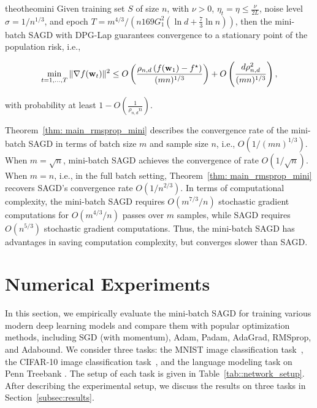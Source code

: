 \documentclass[11pt]{article}
\begin{document}
\begin{restatable}{theo}{theomini}
\label{thm: main_rmsprop_mini}
Given training set $S$ of size $n$, with $\nu >0$, $\eta_t = \eta \leq \frac{\nu}{2L}$, noise level $\sigma = 1/n^{1/3}$, and epoch $T = m^{4/3}/\left(n169G_1^2(\ln d + \frac{7}{3}\ln n)\right)$, then the mini-batch \textsc{SAGD} with DPG-Lap  guarantees convergence to a stationary point of the population risk, i.e., 
 \begin{small}
\begin{equation*}
\begin{split}
 \min_{t = 1,..., T}\|\nabla f(\mathbf{w}_t)\|^2 
 \leq O\left( \frac{\rho_{n,d} \left(f(\mathbf{w}_1) - f^\star \right)}{(mn)^{1/3}} \right)+ O \left( \frac{d \rho_{n,d}^2}{(mn)^{1/3}}\right),
 \end{split}
\end{equation*}
\end{small}
with probability at least $1-O\left(\frac{1}{\rho_{n,d} n}\right)$.
\end{restatable}

Theorem~\ref{thm: main_rmsprop_mini} 
describes the convergence rate of the mini-batch \textsc{SAGD} in terms of batch size $m$ and sample size $n$, i.e., $O(1/(mn)^{1/3})$. 
When $m = \sqrt{n}$, mini-batch \textsc{SAGD} achieves the convergence of rate $O(1/\sqrt{n})$. When $m=n$, i.e., in the full batch setting, Theorem~\ref{thm: main_rmsprop_mini} recovers \textsc{SAGD}'s convergence rate  $O(1/n^{2/3})$. 
In terms of computational complexity, the mini-batch \textsc{SAGD} requires $O(m^{7/3}/n)$ stochastic gradient computations for $O(m^{4/3}/n)$ passes over $m$ samples, while \textsc{SAGD} requires $O(n^{5/3})$ stochastic gradient computations. Thus, the mini-batch \textsc{SAGD} has advantages in saving computation complexity, but converges slower than \textsc{SAGD}.







\section{Numerical Experiments} \label{sec: experiment}
In this section, we empirically evaluate the mini-batch \textsc{SAGD}
for training various modern deep
learning models and compare them with popular optimization methods, including SGD (with momentum), Adam, Padam,  AdaGrad,  RMSprop, and Adabound. 
We consider three tasks: the MNIST image classification task~\citep{lebo1998}, the CIFAR-10 image
classification task~\citep{krhi2009}, and the language modeling task on Penn Treebank
\citep{mama1993}. The setup of each task is given in Table~\ref{tab::network_setup}. 
After describing the experimental setup, we discuss the results on three tasks in Section~\ref{subsec:results}.
\end{document}
